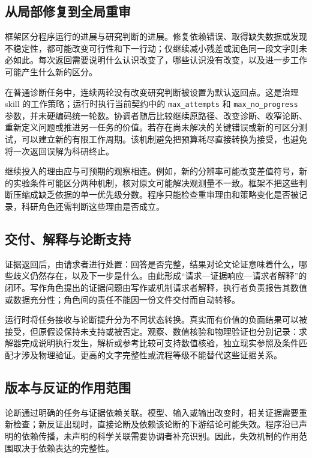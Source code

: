 \documentclass[UTF8,fontset=fandol,a4paper,11pt]{ctexart}
\begin{document}
\subsection{从局部修复到全局重审}

框架区分程序运行的进展与研究判断的进展。修复依赖错误、取得缺失数据或发现不稳定性，都可能改变可行性和下一行动；仅继续减小残差或润色同一段文字则未必如此。每次返回需要说明什么认识改变了，哪些认识没有改变，以及进一步工作可能产生什么新的区分。

在普通诊断任务中，连续两轮没有改变研究判断被设置为默认返回点。这是治理 skill 的工作策略；运行时执行当前契约中的 \texttt{max\_attempts} 和 \texttt{max\_no\_progress} 参数，并未硬编码统一轮数。协调者随后比较继续原路径、改变诊断、收窄论断、重新定义问题或推进另一任务的价值。若存在尚未解决的关键错误或新的可区分测试，可以建立新的有限工作周期。该机制避免把预算耗尽直接转换为接受，也避免将一次返回误解为科研终止。

继续投入的理由应与可预期的观察相连。例如，新的分辨率可能改变差值符号，新的实验条件可能区分两种机制，核对原文可能解决观测量不一致。框架不把这些判断压缩成缺乏依据的单一优先级分数。程序只能检查重审理由和策略变化是否被记录，科研角色还需判断这些理由是否成立。

\subsection{交付、解释与论断支持}

证据返回后，由请求者进行处置：回答是否完整，结果对论文论证意味着什么，哪些歧义仍然存在，以及下一步是什么。由此形成“请求—证据响应—请求者解释”的闭环。写作角色提出的证据问题由写作或机制请求者解释，执行者负责报告其数值或数据充分性；角色间的责任不能因一份文件交付而自动转移。

运行时将任务接收与论断提升分为不同状态转换。真实而有价值的负面结果可以被接受，但原假设保持未支持或被否定。观察、数值核验和物理验证也分别记录：求解器完成说明执行发生，解析或参考比较可支持数值核验，独立现实参照及条件匹配才涉及物理验证。更高的文字完整性或流程等级不能替代这些证据关系。

\subsection{版本与反证的作用范围}

论断通过明确的任务与证据依赖关联。模型、输入或输出改变时，相关证据需要重新检查；新反证出现时，直接论断及依赖该论断的下游结论可能失效。程序沿已声明的依赖传播，未声明的科学关联需要协调者补充识别。因此，失效机制的作用范围取决于依赖表达的完整性。
\end{document}
